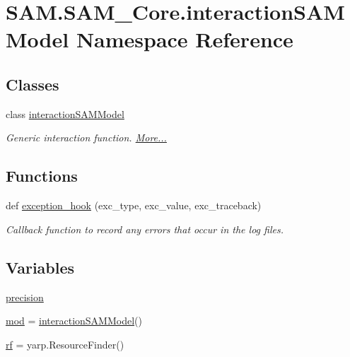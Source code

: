 \hypertarget{namespaceSAM_1_1SAM__Core_1_1interactionSAMModel}{}\section{S\+A\+M.\+S\+A\+M\+\_\+\+Core.\+interaction\+S\+A\+M\+Model Namespace Reference}
\label{namespaceSAM_1_1SAM__Core_1_1interactionSAMModel}
\subsection*{Classes}
\begin{DoxyCompactItemize}
\item 
class \hyperlink{group__icubclient__SAM__Core_classSAM_1_1SAM__Core_1_1interactionSAMModel_1_1interactionSAMModel}{interaction\+S\+A\+M\+Model}
\begin{DoxyCompactList}\small\item\em Generic interaction function.  \hyperlink{group__icubclient__SAM__Core_classSAM_1_1SAM__Core_1_1interactionSAMModel_1_1interactionSAMModel}{More...}\end{DoxyCompactList}\end{DoxyCompactItemize}
\subsection*{Functions}
\begin{DoxyCompactItemize}
\item 
def \hyperlink{namespaceSAM_1_1SAM__Core_1_1interactionSAMModel_af61a343a4521eee226bc19ee9931915e}{exception\+\_\+hook} (exc\+\_\+type, exc\+\_\+value, exc\+\_\+traceback)
\begin{DoxyCompactList}\small\item\em Callback function to record any errors that occur in the log files. \end{DoxyCompactList}\end{DoxyCompactItemize}
\subsection*{Variables}
\begin{DoxyCompactItemize}
\item 
\hyperlink{namespaceSAM_1_1SAM__Core_1_1interactionSAMModel_ad95d88996dee123f932dd0236e44687a}{precision}
\item 
\hyperlink{namespaceSAM_1_1SAM__Core_1_1interactionSAMModel_ac8fc99c1044c90d77d2bc1d470ed11bd}{mod} = \hyperlink{group__icubclient__SAM__Core_classSAM_1_1SAM__Core_1_1interactionSAMModel_1_1interactionSAMModel}{interaction\+S\+A\+M\+Model}()
\item 
\hyperlink{namespaceSAM_1_1SAM__Core_1_1interactionSAMModel_a5b02d7b171d64258c379d4a115b9b6f6}{rf} = yarp.\+Resource\+Finder()
\end{DoxyCompactItemize}


